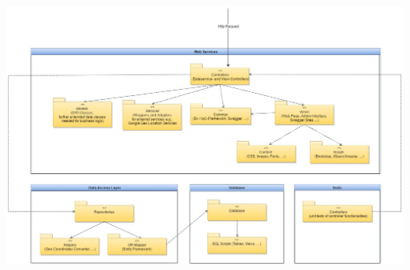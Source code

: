 \documentclass[a4paper,10pt,xetex]{article}
\begin{document}
\begin{center}
  \includegraphics[width=7.3264in,height=4.7646in]{backend_architektur1.jpg}
\end{center}

\bigskip


\bigskip
\end{document}
